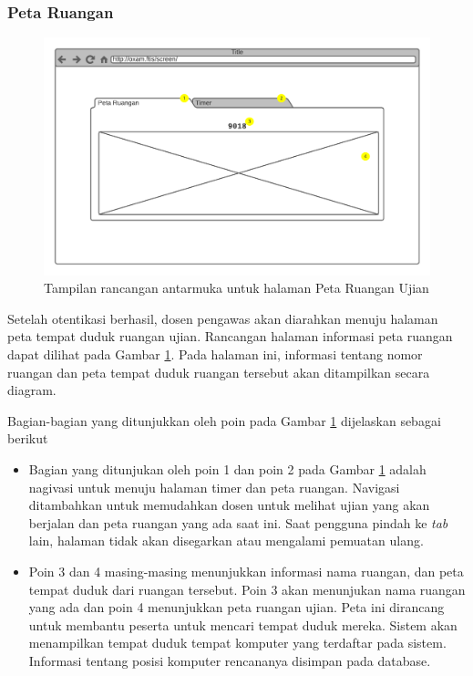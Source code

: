 \subsubsection{Peta Ruangan}
    \begin{figure}
        \centering
        \includegraphics[width=0.7\paperwidth]{Gambar/mockups/Mockup--DosenPengawas - Seatmap.pdf}
        \caption{Tampilan rancangan antarmuka untuk halaman Peta Ruangan Ujian}
        \label{fig:mockup_dosen_seatmap}
    \end{figure}
    Setelah otentikasi berhasil, dosen pengawas akan diarahkan menuju halaman
    peta tempat duduk ruangan ujian. Rancangan halaman informasi peta ruangan
    dapat dilihat pada Gambar \ref{fig:mockup_dosen_seatmap}. Pada halaman ini,
    informasi tentang nomor ruangan dan peta tempat duduk ruangan tersebut akan
    ditampilkan secara diagram.
    
    Bagian-bagian yang ditunjukkan oleh poin pada Gambar
    \ref{fig:mockup_dosen_seatmap} dijelaskan sebagai berikut
    \begin{itemize}
        \item Bagian yang ditunjukan oleh poin 1 dan poin 2 pada Gambar
            \ref{fig:mockup_dosen_seatmap} adalah nagivasi untuk menuju halaman
            timer dan peta ruangan. Navigasi ditambahkan untuk memudahkan dosen
            untuk melihat ujian yang akan berjalan dan peta ruangan yang ada
            saat ini. Saat pengguna pindah ke \textit{tab} lain, halaman tidak
            akan disegarkan atau mengalami pemuatan ulang. 
            
        \item Poin 3 dan 4 masing-masing menunjukkan informasi nama ruangan, dan
            peta tempat duduk dari ruangan tersebut. Poin 3 akan menunjukan nama
            ruangan yang ada dan poin 4 menunjukkan peta ruangan ujian. Peta ini
            dirancang untuk membantu peserta untuk mencari tempat duduk mereka.
            Sistem akan menampilkan tempat duduk tempat komputer yang terdaftar
            pada sistem. Informasi tentang posisi komputer rencananya disimpan
            pada database.
    \end{itemize}
